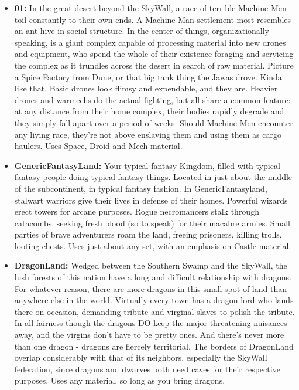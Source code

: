\documentclass[12pt,a4paper,twocolumn]{article}
\begin{document}
\begin{itemize}
\item {\bf 01:} In the great desert beyond the SkyWall, a race of terrible Machine Men toil constantly to their own ends.  A Machine Man settlement most resembles an ant hive in social structure.  In the center of things, organizationally speaking, is a giant complex capable of processing material into new drones and equipment, who spend the whole of their existence foraging and servicing the complex as it trundles across the desert in search of raw material.  Picture a Spice Factory from Dune, or that big tank thing the Jawas drove.  Kinda like that.  Basic drones look flimsy and expendable, and they are.  Heavier drones and warmechs do the actual fighting, but all share a common feature: at any distance from their home complex, their bodies rapidly degrade and they simply fall apart over a period of weeks.  Should Machine Men encounter any living race, they're not above enslaving them and using them as cargo haulers.  Uses Space, Droid and Mech material.

\item {\bf GenericFantasyLand:} Your typical fantasy Kingdom, filled with typical fantasy people doing typical fantasy things.  Located in just about the middle of the subcontinent, in typical fantasy fashion.  In GenericFantasyland, stalwart warriors give their lives in defense of their homes.  Powerful wizards erect towers for arcane purposes.  Rogue necromancers stalk through catacombs, seeking fresh blood (so to speak) for their macabre armies.  Small parties of brave adventurers roam the land, freeing prisoners, killing trolls, looting chests.  Uses just about any set, with an emphasis on Castle material.

\item {\bf DragonLand:} Wedged between the Southern Swamp and the SkyWall, the lush forests of this nation have a long and difficult relationship with dragons.  For whatever reason, there are more dragons in this small spot of land than anywhere else in the world.  Virtually every town has a dragon lord who lands there on occasion, demanding tribute and virginal slaves to polish the tribute.  In all fairness though the dragons DO keep the major threatening nuisances away, and the virgins don't have to be pretty ones.  And there's never more than one dragon - dragons are fiercely territorial.  The borders of DragonLand overlap considerably with that of its neighbors, especially the SkyWall federation, since dragons and dwarves both need caves for their respective purposes.  Uses any material, so long as you bring dragons. 


\end{itemize}
\end{document}
